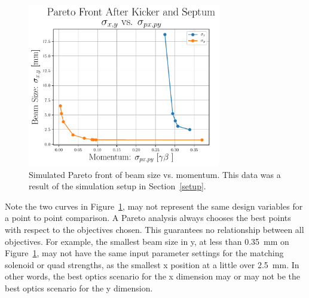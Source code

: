 \begin{figure}
	\centering
	\includegraphics[width=0.75\textwidth]{./images/xy_vs_pxpy_pareto_front_Q5}
	\caption{Simulated Pareto front of beam size vs. momentum.
		This data was a result of the simulation setup in Section~\ref{setup}.}
	\label{fig:tba-paretoxy}
\end{figure}
Note the two curves in Figure~\ref{fig:tba-paretoxy}, may not represent the same 
design variables for a point to point comparison. A Pareto analysis always 
chooses the best points with respect to the objectives chosen. This guarantees no 
relationship between all objectives. 
For example, the smallest beam size in y, at less than \SI{0.35}{mm} on Figure~\ref{fig:tba-paretoxy}, 
may not have the same input parameter settings for the matching solenoid or quad strengths, as the smallest x position 
at a little over \SI{2.5}{mm}. In other words, the best optics scenario for the x dimension
may or may not be the best optics scenario for the y dimension. 


